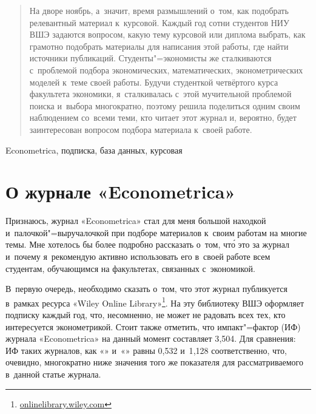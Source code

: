 \documentclass[11pt]{article}
\begin{document}
	
\AUTHOR{}{}
\SHORTAUTHOR{}

\DoFirstPageTechnicalStuff
		
\begin{abstract}
			На дворе ноябрь, а~значит, время размышлений о~том, как подобрать релевантный материал к~курсовой. Каждый год сотни студентов НИУ ВШЭ задаются вопросом, какую тему курсовой или диплома выбрать, как грамотно подобрать материалы для написания этой работы, где найти источники публикаций. Студенты"=экономисты же сталкиваются с~проблемой подбора экономических, математических, эконометрических моделей к~теме своей работы. Будучи студенткой четвёртого курса факультета экономики, я~сталкивалась с~этой мучительной проблемой поиска и~выбора многократно, поэтому решила поделиться одним своим наблюдением со~всеми теми, кто читает этот журнал и, вероятно, будет заинтересован вопросом подбора материала к~своей работе.
		\end{abstract}
		
\begin{keyword} Econometrica, подписка, база данных, курсовая
\end{keyword}
	
	
	\section{О журнале «Econometrica»}


Признаюсь, журнал «Econometrica» стал для меня большой находкой и~палочкой"=выручалочкой при подборе материалов к~своим работам на многие темы. Мне хотелось бы более подробно рассказать о~том, чт\'{о} это за журнал и~почему я~рекомендую активно использовать его в~своей работе всем студентам, обучающимся на факультетах, связанных с~экономикой.

В~первую очередь, необходимо сказать о~том, что этот журнал публикуется в~рамках ресурса «Wiley Online Library»\footnote{\href{http://onlinelibrary.wiley.com/}{onlinelibrary.wiley.com}}\fnnsp. На эту библиотеку ВШЭ оформляет подписку каждый год, что, несомненно, не может не радовать всех тех, кто интересуется эконометрикой. Стоит также отметить, что импакт"=фактор (ИФ) журнала «Econometrica» на данный момент составляет 3{,}504. Для сравнения: ИФ таких журналов, как «» и~«» равны 0{,}532 и~1{,}128 соответственно, что, очевидно, многократно ниже значения того же показателя для рассматриваемого в~данной статье журнала.
\end{document}
